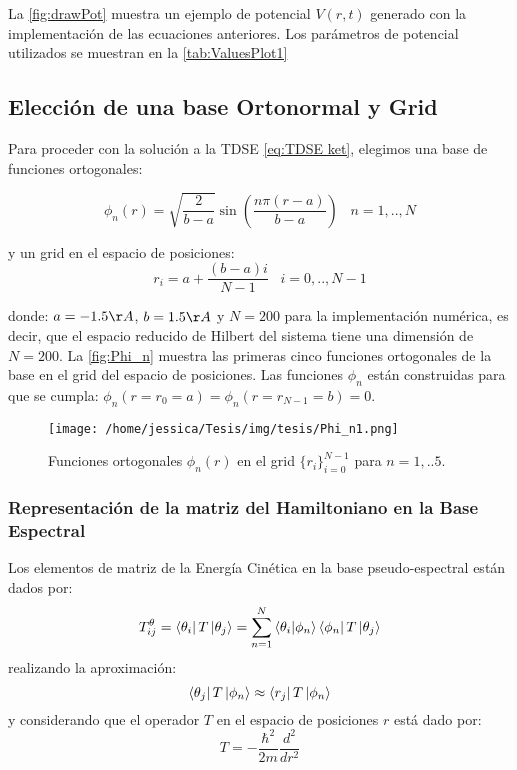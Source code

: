 La \autoref{fig:drawPot} muestra un ejemplo de potencial $V(r,t)$ generado con la implementación de las ecuaciones anteriores. Los parámetros de potencial utilizados se muestran en la \autoref{tab:ValuesPlot1}

\subsection{Elección de una base Ortonormal y Grid}

Para proceder con la solución a la \acs{TDSE} \autoref{eq:TDSE ket}, elegimos una base de funciones ortogonales: \cite{Colbert1992}

\begin{equation}
  \label{eq:eigenfunc}
  \phi_n(r)=\sqrt{\frac{2}{b-a}}\sin\left( \frac{n\pi(r-a)}{b-a}\right) \,\,\,\,\, n=1,..,N
\end{equation}

y un grid en el espacio de posiciones:
\begin{equation}
  \label{eq:grid}
  r_i = a + \frac{(b-a)i}{N-1} \,\,\,\,\, i=0,..,N-1
\end{equation}

donde: $a=-1.5\AA$, $b=1.5\AA$ y $N=200$ para la implementación numérica, es decir, que el espacio reducido de Hilbert del sistema tiene una dimensión de $N=200$. La \autoref{fig:Phi_n} muestra las primeras cinco funciones ortogonales de la base en el grid del espacio de posiciones. Las funciones $\phi_n$ están construidas para que se cumpla: $\phi_n(r=r_0=a)=\phi_n(r=r_{N-1}=b)=0$.

\begin{figure}[ht]
  \centering
  \texttt{[image: /home/jessica/Tesis/img/tesis/Phi\_n1.png]}
  \caption{Funciones ortogonales $\phi_n(r)$ en el grid $\{r_i\}_{i=0}^{N-1}$ para $n=1,..5$.}
  \label{fig:Phi_n}
\end{figure}

\subsubsection{Representación de la matriz del Hamiltoniano en la Base Espectral}

Los elementos de matriz de la Energía Cinética en la base pseudo-espectral están dados por:
\begin{equation}
  \label{eq:T}
T^{\theta}_{ij}= \bra{\theta_i}T\ket{\theta_j}=\sum_{n=1}^N\bra{\theta_i}\ket{\phi_n}\bra{\phi_n}T\ket{\theta_j}
\end{equation}
realizando la aproximación:
$$\bra{\theta_j}T\ket{\phi_n} \approx \bra{r_j}T\ket{\phi_n}$$
y considerando que el operador $T$ en el espacio de posiciones $r$ está dado por:
\begin{equation}
  \label{eq:Toperator}
  T = -\frac{\hbar^2}{2m}\frac{d^2}{dr^2}
\end{equation}


